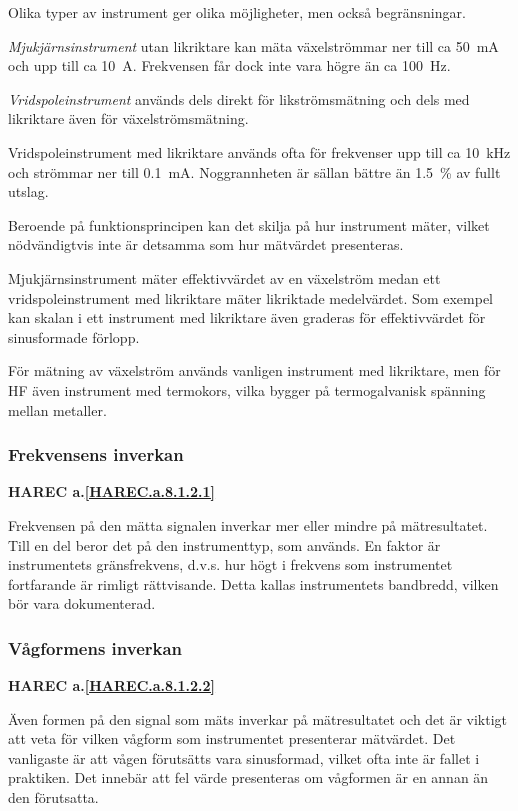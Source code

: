 Olika typer av instrument ger olika möjligheter, men också begränsningar.

\emph{Mjukjärnsinstrument} utan likriktare kan mäta växelströmmar ner
till ca 50~mA och upp till ca 10~A. Frekvensen får dock inte vara
högre än ca 100~Hz.

\emph{Vridspoleinstrument} används dels direkt för likströmsmätning
och dels med likriktare även för växelströmsmätning.

Vridspoleinstrument med likriktare används ofta för frekvenser upp
till ca 10~kHz och strömmar ner till 0.1~mA. Noggrannheten är sällan
bättre än 1.5~\% av fullt utslag.

Beroende på funktionsprincipen kan det skilja på hur instrument mäter,
vilket nödvändigtvis inte är detsamma som hur mätvärdet presenteras.

Mjukjärnsinstrument mäter effektivvärdet av en växelström medan ett
vridspoleinstrument med likriktare mäter likriktade medelvärdet. Som
exempel kan skalan i ett instrument med likriktare även graderas för
effektivvärdet för sinusformade förlopp.

För mätning av växelström används vanligen instrument med likriktare,
men för HF även instrument med termokors, vilka bygger på
termogalvanisk spänning mellan metaller.

\subsubsection{Frekvensens inverkan}
\textbf{
HAREC a.\ref{HAREC.a.8.1.2.1}\label{myHAREC.a.8.1.2.1}
}

Frekvensen på den mätta signalen inverkar mer eller mindre på
mätresultatet. Till en del beror det på den instrumenttyp, som
används. En faktor är instrumentets gränsfrekvens, d.v.s. hur högt i
frekvens som instrumentet fortfarande är rimligt rättvisande. Detta
kallas instrumentets bandbredd, vilken bör vara dokumenterad.

\subsubsection{Vågformens inverkan}
\textbf{
HAREC a.\ref{HAREC.a.8.1.2.2}\label{myHAREC.a.8.1.2.2}
}

Även formen på den signal som mäts inverkar på mätresultatet och det
är viktigt att veta för vilken vågform som instrumentet presenterar
mätvärdet. Det vanligaste är att vågen förutsätts vara sinusformad,
vilket ofta inte är fallet i praktiken. Det innebär att fel värde
presenteras om vågformen är en annan än den förutsatta.

